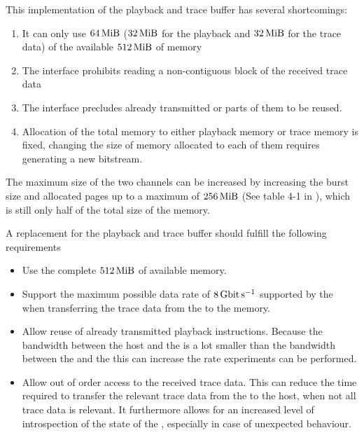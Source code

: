 This implementation of the playback and trace buffer has several shortcomings:
\begin{enumerate}
  \item It can only use \(\SI{64}{\mebi\byte}\) (\(\SI{32}{\mebi\byte}\) for the playback and \(\SI{32}{\mebi\byte}\) for the trace data) of the available $\DDRSIZE{}$ of memory\label{point:limited_size}
  \item The \FIFO{} interface prohibits reading a non-contiguous block of the received trace data
  \item The \FIFO{} interface precludes already transmitted \PlaybackProgram{} or parts of them to be reused.
  \item Allocation of the total memory to either playback memory or trace memory is fixed, changing the size of memory allocated to each of them requires generating a new \FPGA{} bitstream.
\end{enumerate}
The maximum size of the two \VFIFO{} channels can be increased by increasing the burst size and allocated pages up to a maximum of \(\SI{256}{\mebi\byte}\) (See table 4-1 in \autocite{ref:vfifo}), which is still only half of the total size of the memory.

A replacement for the playback and trace buffer should fulfill the following requirements
\begin{itemize}
  \item Use the complete $\DDRSIZE{}$ of available memory.
  \item Support the maximum possible data rate of $\pbExecBandwidth{}$ supported by the \pbexec{} when transferring the trace data from the \pbexec{} to the memory.
  \item Allow reuse of already transmitted playback instructions. Because the bandwidth between the host and the \FPGA{} is a lot smaller than the bandwidth between the \FPGA{} and the \ASIC{} this can increase the rate experiments can be performed.
  \item Allow out of order access to the received trace data. This can reduce the time required to transfer the relevant trace data from the \FPGA{} to the host, when not all trace data is relevant.  It furthermore allows for an increased level of introspection of the state of the \FPGA{}, especially in case of unexpected behaviour.
\end{itemize}
